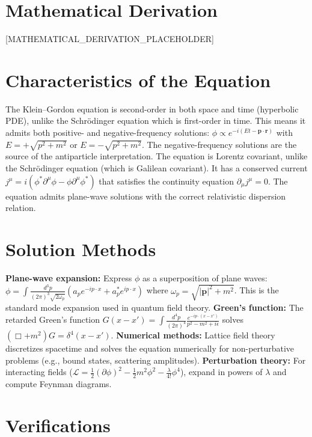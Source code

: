 \documentclass[11pt,openright]{book}
\begin{document}
\section*{Mathematical Derivation}

[MATHEMATICAL_DERIVATION_PLACEHOLDER]

\section*{Characteristics of the Equation}

The Klein--Gordon equation is second-order in both space and time (hyperbolic PDE), unlike the Schr\"odinger equation which is first-order in time. This means it admits both positive- and negative-frequency solutions: $\phi \propto e^{-i(Et - \mathbf{p}\cdot\mathbf{r})}$ with $E = +\sqrt{p^2 + m^2}$ or $E = -\sqrt{p^2 + m^2}$. The negative-frequency solutions are the source of the antiparticle interpretation. The equation is Lorentz covariant, unlike the Schr\"odinger equation (which is Galilean covariant). It has a conserved current $j^\mu = i(\phi^*\partial^\mu\phi - \phi\partial^\mu\phi^*)$ that satisfies the continuity equation $\partial_\mu j^\mu = 0$. The equation admits plane-wave solutions with the correct relativistic dispersion relation.
\section*{Solution Methods}

\textbf{Plane-wave expansion:} Express $\phi$ as a superposition of plane waves: $\phi = \int \frac{d^3p}{(2\pi)^3\sqrt{2\omega_p}}(a_p e^{-ip\cdot x} + a_p^* e^{ip\cdot x})$ where $\omega_p = \sqrt{|\mathbf{p}|^2 + m^2}$. This is the standard mode expansion used in quantum field theory. \textbf{Green's function:} The retarded Green's function $G(x - x') = \int \frac{d^4p}{(2\pi)^4}\frac{e^{-ip\cdot(x-x')}}{p^2 - m^2 + i\epsilon}$ solves $(\Box + m^2)G = \delta^4(x - x')$. \textbf{Numerical methods:} Lattice field theory discretizes spacetime and solves the equation numerically for non-perturbative problems (e.g., bound states, scattering amplitudes). \textbf{Perturbation theory:} For interacting fields ($\mathcal{L} = \frac{1}{2}(\partial\phi)^2 - \frac{1}{2}m^2\phi^2 - \frac{\lambda}{4!}\phi^4$), expand in powers of $\lambda$ and compute Feynman diagrams.
\section*{Verifications}
\end{document}
